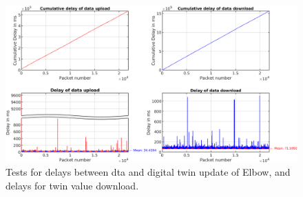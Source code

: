 \begin{figure}[htbp]
    \centering
    \includegraphics[width=\textwidth]{figures/appendix/DT/Delay_UploadDownload_Elbow.png}
    \caption{Tests for delays between \gls{dta} and digital twin update of Elbow, 
    and delays for twin value download. \label{fig: UD-sep-Elbow}}
\end{figure}




%

